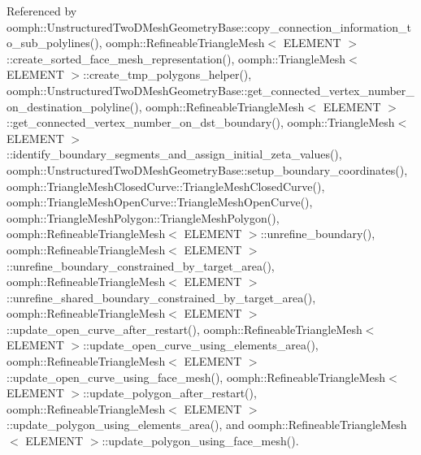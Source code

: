 Referenced by oomph\+::\+Unstructured\+Two\+D\+Mesh\+Geometry\+Base\+::copy\+\_\+connection\+\_\+information\+\_\+to\+\_\+sub\+\_\+polylines(), oomph\+::\+Refineable\+Triangle\+Mesh$<$ E\+L\+E\+M\+E\+N\+T $>$\+::create\+\_\+sorted\+\_\+face\+\_\+mesh\+\_\+representation(), oomph\+::\+Triangle\+Mesh$<$ E\+L\+E\+M\+E\+N\+T $>$\+::create\+\_\+tmp\+\_\+polygons\+\_\+helper(), oomph\+::\+Unstructured\+Two\+D\+Mesh\+Geometry\+Base\+::get\+\_\+connected\+\_\+vertex\+\_\+number\+\_\+on\+\_\+destination\+\_\+polyline(), oomph\+::\+Refineable\+Triangle\+Mesh$<$ E\+L\+E\+M\+E\+N\+T $>$\+::get\+\_\+connected\+\_\+vertex\+\_\+number\+\_\+on\+\_\+dst\+\_\+boundary(), oomph\+::\+Triangle\+Mesh$<$ E\+L\+E\+M\+E\+N\+T $>$\+::identify\+\_\+boundary\+\_\+segments\+\_\+and\+\_\+assign\+\_\+initial\+\_\+zeta\+\_\+values(), oomph\+::\+Unstructured\+Two\+D\+Mesh\+Geometry\+Base\+::setup\+\_\+boundary\+\_\+coordinates(), oomph\+::\+Triangle\+Mesh\+Closed\+Curve\+::\+Triangle\+Mesh\+Closed\+Curve(), oomph\+::\+Triangle\+Mesh\+Open\+Curve\+::\+Triangle\+Mesh\+Open\+Curve(), oomph\+::\+Triangle\+Mesh\+Polygon\+::\+Triangle\+Mesh\+Polygon(), oomph\+::\+Refineable\+Triangle\+Mesh$<$ E\+L\+E\+M\+E\+N\+T $>$\+::unrefine\+\_\+boundary(), oomph\+::\+Refineable\+Triangle\+Mesh$<$ E\+L\+E\+M\+E\+N\+T $>$\+::unrefine\+\_\+boundary\+\_\+constrained\+\_\+by\+\_\+target\+\_\+area(), oomph\+::\+Refineable\+Triangle\+Mesh$<$ E\+L\+E\+M\+E\+N\+T $>$\+::unrefine\+\_\+shared\+\_\+boundary\+\_\+constrained\+\_\+by\+\_\+target\+\_\+area(), oomph\+::\+Refineable\+Triangle\+Mesh$<$ E\+L\+E\+M\+E\+N\+T $>$\+::update\+\_\+open\+\_\+curve\+\_\+after\+\_\+restart(), oomph\+::\+Refineable\+Triangle\+Mesh$<$ E\+L\+E\+M\+E\+N\+T $>$\+::update\+\_\+open\+\_\+curve\+\_\+using\+\_\+elements\+\_\+area(), oomph\+::\+Refineable\+Triangle\+Mesh$<$ E\+L\+E\+M\+E\+N\+T $>$\+::update\+\_\+open\+\_\+curve\+\_\+using\+\_\+face\+\_\+mesh(), oomph\+::\+Refineable\+Triangle\+Mesh$<$ E\+L\+E\+M\+E\+N\+T $>$\+::update\+\_\+polygon\+\_\+after\+\_\+restart(), oomph\+::\+Refineable\+Triangle\+Mesh$<$ E\+L\+E\+M\+E\+N\+T $>$\+::update\+\_\+polygon\+\_\+using\+\_\+elements\+\_\+area(), and oomph\+::\+Refineable\+Triangle\+Mesh$<$ E\+L\+E\+M\+E\+N\+T $>$\+::update\+\_\+polygon\+\_\+using\+\_\+face\+\_\+mesh().

